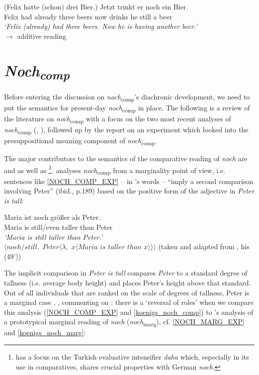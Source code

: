 \documentclass[output=paper,
modfonts
]{langscibook}
\begin{document}
\ea\gll (Felix hatte (schon) drei Bier.) Jetzt trinkt er noch ein Bier.\\
       Felix had already three beers now drinks he still a beer\\
\glt   \textit{`Felix (already) had three beers. Now he is having another beer.'} \\ \hfill $\rightarrow$ additive reading \label{NOCH_ADD_EXP}
\z

\section{\textit{Noch\textsubscript{comp}}}\label{sec_noch-comp_gen}

Before entering the discussion on \textit{noch}\textsubscript{comp}'s diachronic development, we need to put the semantics for present-day \textit{noch}\textsubscript{comp} in place. The following is a review of the literature on \textit{noch}\textsubscript{comp} with a focus on the two most recent analyses of \textit{noch}\textsubscript{comp} (\citet{umbach2009a_comp}, \citet{Hofstetter2013}), followed up by the report on an experiment which looked into the presuppositional meaning component of \textit{noch}\textsubscript{comp}.

The major contributors to the semantics of the comparative reading of \textit{noch} are \citet{koenig1977} and \citet{umbach2009a_comp} as well as \citet{Hofstetter2013}\footnote{ \citet{Hofstetter2013} has a focus on the Turkish evaluative intensifier \textit{daha} which, especially in its use in comparatives, shares crucial properties with German \textit{noch}.}. \citet{koenig1977} analyses \textit{noch}\textsubscript{comp} from a marginality point of view, i.e. sentences like \ref{NOCH_COMP_EXP} -- in \citeauthor{koenig1977}'s words -- ``imply a second comparison involving Peter'' (ibid., p.189) based on the positive form of the adjective in \textit{Peter is tall}:

\ea\gll Maria ist noch größer als Peter.\\
       Maria is still/even taller than Peter\\
\glt   \textit{`Maria is still taller than Peter.'} \label{NOCH_COMP_EXP}\\
\z
\ea $\langle noch/still,$ $Peter\langle\lambda,$ $x\langle Maria$ $is$ $taller$ $than$ $x\rangle\rangle\rangle$ \label{koenigs_noch_comp} \flushright (taken and adapted from \citet{koenig1977}, his (49')) \z

The implicit comparison in \textit{Peter is tall} compares \textit{Peter} to a standard degree of tallness (i.e. average body height) and places Peter's height above that standard. Out of all individuals that are ranked on the scale of degrees of tallness, Peter is a marginal case \citep{koenig1977}. \citet{umbach2009a_comp}, commenting on \citet{koenig1977}: there is a `reversal of roles' when we compare this analysis (\ref{NOCH_COMP_EXP} and \ref{koenigs_noch_comp}) to \citeauthor{koenig1977}'s analysis of a prototypical marginal reading of \textit{noch} (\textit{noch}\textsubscript{marg}), cf. \ref{NOCH_MARG_EXP} and \ref{koenigs_noch_marg}:
\end{document}
